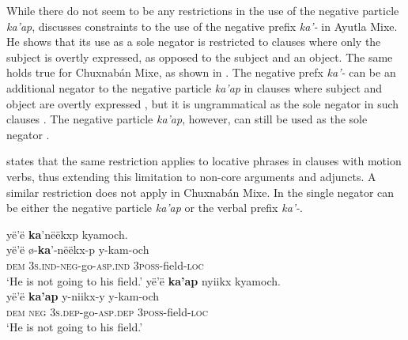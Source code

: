 \documentclass[output=paper,colorlinks,citecolor=brown,draft]{langscibook}
\begin{document}
While there do not seem to be any restrictions in the use of the negative particle \textit{ka’ap}, \citet[453]{Romero-Méndez2009} discusses constraints to the use of the negative prefix \textit{ka’-} in Ayutla Mixe. He shows that its use as a sole negator is restricted to clauses where only the subject is overtly expressed, as opposed to the subject and an object. The same holds true for Chuxnabán Mixe, as shown in . The negative prefx \textit{ka’-} can be an additional negator to the negative particle \textit{ka’ap} in clauses where subject and object are overtly expressed , but it is ungrammatical as the sole negator in such clauses . The negative particle \textit{ka’ap}, however, can still be used as the sole negator .

\ea\label{ex:mix:15}
    \z
\z 

\citet[453]{Romero-Méndez2009} states that the same restriction applies to locative phrases in clauses with motion verbs, thus extending this limitation to non-core arguments and adjuncts. A similar restriction does not apply in Chuxnabán Mixe. In  the single negator can be either the negative particle \textit{ka’ap} or the verbal prefix \textit{ka’-}.

\ea\label{ex:mix:16}
    \ea\label{ex:mix:16a}
        \glll yë’ë \textbf{ka}’nëëkxp kyamoch. \\ 
              yë’ë ø-\textbf{ka}’-nëëkx-p y-kam-och \\
              \textsc{dem} \textsc{3s.ind}{}-\textsc{neg-}go-\textsc{asp.ind} \textsc{3poss}{}-field\textsc{{}-loc}\\
        \glt ‘He is not going to his field.’
    \ex\label{ex:mix:16b}
        \glll yë’ë \textbf{ka’ap} nyiikx kyamoch. \\
              yë’ë \textbf{ka’ap} y-niikx-y y-kam-och \\
             \textsc{dem} \textsc{neg} \textsc{3s.dep}{}-go-\textsc{asp.dep} \textsc{3poss}{}-field\textsc{{}-loc} \\
        \glt ‘He is not going to his field.’
    \z
\z 
\end{document}
